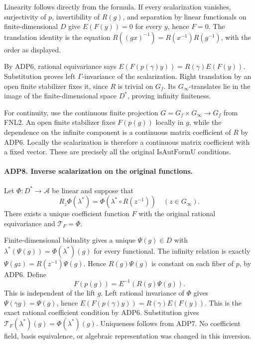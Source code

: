 Linearity follows directly from the formula.  If every scalarization
vanishes, surjectivity of \(p\), invertibility of \(R(g)\), and
separation by linear functionals on finite-dimensional \(D\) give
\(E(F(y))=0\) for every \(y\), hence \(F=0\).  The translation
identity is the equation
\(R((gx)^{-1})=R(x^{-1})R(g^{-1})\), with the order as displayed.

By ADP6, rational equivariance says
\(E(F(p(\gamma)y))=R(\gamma)E(F(y))\).  Substitution proves left
\(\Gamma\)-invariance of the scalarization.  Right translation by
an open finite stabilizer fixes it, since \(R\) is trivial on \(G_f\).
Its \(G_\infty\)-translates lie in the image of the finite-dimensional
space \(D^*\), proving infinity finiteness.

For continuity, use the continuous finite projection
\(G=G_f\times G_\infty\to G_f\) from FNL2.  An open finite
stabilizer fixes \(F(p(g))\) locally in \(g\), while the dependence
on the infinite component is a continuous matrix coefficient of \(R\)
by ADP6.  Locally the scalarization is therefore a continuous matrix
coefficient with a fixed vector.  These are precisely all the original
\(\mathrm{IsAutFormU}\) conditions.

\paragraph{ADP8. Inverse scalarization on the original functions.}
\label{claim:ADP8}
Let \(\Phi:D^*\to\mathcal A\) be linear and suppose that
\[
 R_z\Phi(\lambda^*)
      =\Phi(\lambda^*\circ R(z^{-1}))\quad(z\in G_\infty).
\]
There exists a unique coefficient function \(F\) with the original
rational equivariance and \(\mathcal T_F=\Phi\).

Finite-dimensional biduality gives a unique \(\Psi(g)\in D\) with
\(\lambda^*(\Psi(g))=\Phi(\lambda^*)(g)\) for every functional.
The infinity relation is exactly
\(\Psi(gz)=R(z^{-1})\Psi(g)\).  Hence \(R(g)\Psi(g)\) is constant
on each fiber of \(p\), by ADP6.  Define
\[
                    F(p(g))=E^{-1}(R(g)\Psi(g)).
\]
This is independent of the lift \(g\).  Left rational invariance of
\(\Phi\) gives \(\Psi(\gamma g)=\Psi(g)\), hence
\(E(F(p(\gamma)y))=R(\gamma)E(F(y))\).  This is the exact rational
coefficient condition by ADP6.  Substitution gives
\(\mathcal T_F(\lambda^*)(g)=\Phi(\lambda^*)(g)\).  Uniqueness
follows from ADP7.  No coefficient field, basis equivalence, or
algebraic representation was changed in this inversion.

